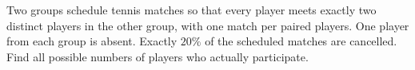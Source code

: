 Two groups schedule tennis matches so that every player meets exactly two distinct players in the other group, with one match per paired players. One player from each group is absent. Exactly $20\%$ of the scheduled matches are cancelled. Find all possible numbers of players who actually participate.
